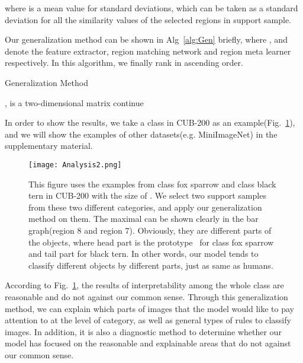 \documentclass[letterpaper]{article}
\begin{document}
where  is a mean value for standard deviations, which can be taken as a standard deviation for all the similarity values of the selected regions in support sample. 

Our generalization method can be shown in Alg~\ref{alg:Gen} briefly, where ,  and  denote the feature extractor, region matching network and region meta learner respectively. In this algorithm, we finally rank  in ascending order.

\begin{algorithm}
\caption{Generalization Method}
\label{alg:Gen}
\begin{algorithmic}[1]
\REQUIRE , 
\ENSURE 
\STATE  is a two-dimensional matrix
\STATE 
\FOR{} 
\STATE 
\IF{}
\STATE 
\STATE 
\ELSE 
\STATE continue
\ENDIF
\ENDFOR 
\FOR{}
\STATE 
\ENDFOR
\end{algorithmic}
\end{algorithm}

In order to show the results, we take a class in CUB-200 as an example(Fig.~\ref{Fig:Analysis}), and we will show the examples of other datasets(e.g. MiniImageNet) in the supplementary material. 

\begin{figure}
    \centering
    \texttt{[image: Analysis2.png]}
    \caption{This figure uses the examples from class fox sparrow and class black tern in CUB-200 with the size of . We select two support samples from these two different categories, and apply our generalization method on them. The maximal  can be shown clearly in the bar graph(region 8 and region 7). Obviously, they are different parts of the objects, where head part is the prototype~\cite{Chen2018ThisLL} for class fox sparrow and tail part for black tern. In other words, our model tends to classify different objects by different parts, just as same as humans.}
    \label{Fig:Analysis}
\end{figure}

According to Fig.~\ref{Fig:Analysis}, the results of interpretability among the whole class are reasonable and do not against our common sense. Through this generalization method, we can explain which parts of images that the model would like to pay attention to at the level of category, as well as general types of rules to classify images. In addition, it is also a diagnostic method to determine whether our model has focused on the reasonable and explainable areas that do not against our common sense. 
\end{document}
